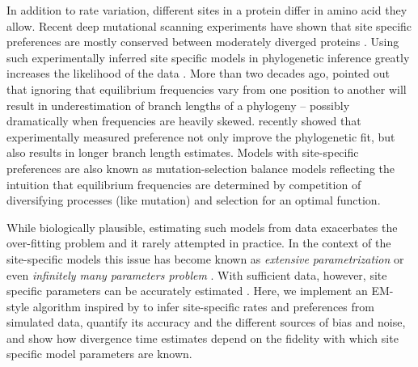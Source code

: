 \documentclass[aps,rmp,twocolumn]{revtex4}
\begin{document}
In addition to rate variation, different sites in a protein differ in amino acid they allow.
Recent deep mutational scanning experiments have shown that site specific preferences are mostly conserved between moderately diverged proteins \citep{doud_site-specific_2015}.
Using such experimentally inferred site specific models in phylogenetic inference greatly increases the likelihood of the data \cite{bloom2014experimentally}.
More than two decades ago, \citet{halpern_evolutionary_1998} pointed out that ignoring that equilibrium frequencies vary from one position to another will result in underestimation of branch lengths of a phylogeny -- possibly dramatically when frequencies are heavily skewed.
\citet{hilton_modeling_2018} recently showed that experimentally measured preference not only improve the phylogenetic fit, but also results in longer branch length estimates.
Models with site-specific preferences are also known as mutation-selection balance models \citep{bruno1996modeling,yang2008mutation} reflecting the intuition that equilibrium frequencies are determined by competition of diversifying processes (like mutation) and selection for an optimal function.

While biologically plausible, estimating such models from data exacerbates the over-fitting problem and it rarely attempted in practice.
In the context of the site-specific models this issue has become known as {\em extensive parametrization} or even {\em infinitely many parameters problem} \cite{Rodrigue557,spielman2016extensively}.
With sufficient data, however, site specific parameters can be accurately estimated \citep{tamuri_estimating_2012,spielman2016extensively,scheffler2014validity}.
Here, we implement an EM-style algorithm inspired by \citep{bruno1996modeling} to infer site-specific rates and preferences from simulated data, quantify its accuracy and the different sources of bias and noise, and show how divergence time estimates depend on the fidelity with which site specific model parameters are known.
\end{document}
